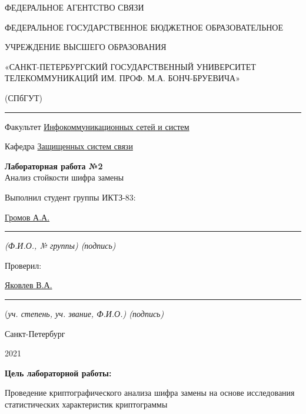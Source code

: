 \documentclass[a4paper,14pt]{extarticle}
\begin{document}
    \begin{center}
        \thispagestyle{empty}
        \begin{singlespace}
        ФЕДЕРАЛЬНОЕ АГЕНТСТВО СВЯЗИ

        ФЕДЕРАЛЬНОЕ ГОСУДАРСТВЕННОЕ БЮДЖЕТНОЕ ОБРАЗОВАТЕЛЬНОЕ

        УЧРЕЖДЕНИЕ ВЫСШЕГО ОБРАЗОВАНИЯ

        «САНКТ-ПЕТЕРБУРГСКИЙ ГОСУДАРСТВЕННЫЙ УНИВЕРСИТЕТ ТЕЛЕКОММУНИКАЦИЙ ИМ. ПРОФ. М.А. БОНЧ-БРУЕВИЧА»

        (СПбГУТ)
        \end{singlespace}
        \vspace{-1ex}
        \rule{\textwidth}{0.4pt}
        \vspace{-5ex}

        Факультет \underline{Инфокоммуникационных сетей и систем}

        Кафедра \underline{Защищенных систем связи}
        \vspace{10ex}

        \textbf{Лабораторная работа №2}\\
        Анализ стойкости шифра замены


    \end{center}
    \vspace{4ex}
    \begin{flushright}
    \parbox{10 cm}{
    \begin{flushleft}
        Выполнил студент группы ИКТЗ-83:

        \underline{Громов А.А. } \hfill \rule[-0.85ex]{0.1\textwidth}{0.6pt}

        \footnotesize \textit{ (Ф.И.О., № группы) \hfill (подпись)} \normalsize

        Проверил:

        \underline{Яковлев В.А.} \hfill \rule[-0.85ex]{0.1\textwidth}{0.6pt}

        (\footnotesize \textit{уч. степень, уч. звание, Ф.И.О.) \hfill (подпись)} \normalsize

    \end{flushleft}
    }
    \end{flushright}
    \begin{center}
        \vfill
        Санкт-Петербург

        2021

    \end{center}
    \newpage

    \textbf{Цель лабораторной работы:} \par
    Проведение криптографического анализа шифра замены на основе исследования статистических характеристик криптограммы
\end{document}
